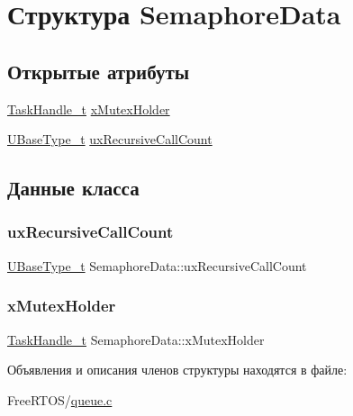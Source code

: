 \hypertarget{struct_semaphore_data}{}\section{Структура Semaphore\+Data}
\label{struct_semaphore_data}
\subsection*{Открытые атрибуты}
\begin{DoxyCompactItemize}
\item 
\mbox{\hyperlink{task_8h_a25b35e6e19ecf894173e7ff95edb96ef}{Task\+Handle\+\_\+t}} \mbox{\hyperlink{struct_semaphore_data_ab1ed54c7b39dc45b3c310fae7ad08693}{x\+Mutex\+Holder}}
\item 
\mbox{\hyperlink{portmacro_8h_a646f89d4298e4f5afd522202b11cb2e6}{U\+Base\+Type\+\_\+t}} \mbox{\hyperlink{struct_semaphore_data_aa428fcfc6e5831d054234444fde56574}{ux\+Recursive\+Call\+Count}}
\end{DoxyCompactItemize}


\subsection{Данные класса}
\mbox{\label{struct_semaphore_data_aa428fcfc6e5831d054234444fde56574}} 
\subsubsection{\texorpdfstring{uxRecursiveCallCount}{uxRecursiveCallCount}}
{\footnotesize\ttfamily \mbox{\hyperlink{portmacro_8h_a646f89d4298e4f5afd522202b11cb2e6}{U\+Base\+Type\+\_\+t}} Semaphore\+Data\+::ux\+Recursive\+Call\+Count}

\mbox{\label{struct_semaphore_data_ab1ed54c7b39dc45b3c310fae7ad08693}} 
\subsubsection{\texorpdfstring{xMutexHolder}{xMutexHolder}}
{\footnotesize\ttfamily \mbox{\hyperlink{task_8h_a25b35e6e19ecf894173e7ff95edb96ef}{Task\+Handle\+\_\+t}} Semaphore\+Data\+::x\+Mutex\+Holder}



Объявления и описания членов структуры находятся в файле\+:\begin{DoxyCompactItemize}
\item 
Free\+R\+T\+O\+S/\mbox{\hyperlink{queue_8c}{queue.\+c}}\end{DoxyCompactItemize}
